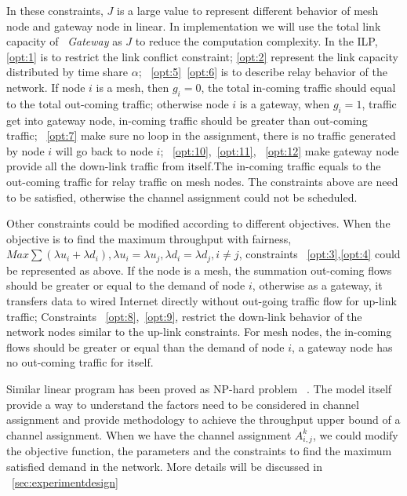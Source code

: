 In these constraints, $J$ is a large value to represent different behavior of mesh node and gateway node in linear. In implementation we will use the total link capacity of ~\emph{Gateway} as $J$ to reduce the computation complexity.
In the ILP, \ref{opt:1} is to restrict the link conflict constraint; \ref{opt:2} represent the link capacity distributed by time share $\alpha$; 
~\ref{opt:5}~\ref{opt:6} is to describe relay behavior of the network. If node $i$ is a mesh, then $g_i=0$, the total in-coming traffic should equal to the total out-coming traffic; otherwise node $i$ is a gateway, when $g_i=1$, traffic get into gateway node, in-coming traffic should be greater than out-coming traffic;
~\ref{opt:7} make sure no loop in the assignment, there is no traffic generated by node $i$ will go back to node $i$;
~\ref{opt:10},~\ref{opt:11}, ~\ref{opt:12}
 make gateway node provide all the down-link traffic from itself.The in-coming traffic equals to the out-coming traffic for relay traffic on mesh nodes.
The constraints above are need to be satisfied, otherwise the channel assignment could not be scheduled.

Other constraints could be modified according to different objectives. When the objective is to find the maximum throughput with fairness, $Max\sum(\lambda u_i+\lambda d_i), \lambda u_i=\lambda u_j, \lambda d_i=\lambda d_j, i\neq j$, constraints ~\ref{opt:3},\ref{opt:4} could be represented as above. 
If the node is a mesh, the summation out-coming flows should be greater or equal to the demand of node $i$, otherwise as a gateway, it transfers data to wired Internet directly without out-going traffic flow for up-link traffic;
Constraints ~\ref{opt:8},~\ref{opt:9}, 
restrict the down-link behavior of the network nodes similar to the up-link constraints. For mesh nodes, the in-coming flows should be greater or equal than the demand of node $i$, a gateway node has no out-coming traffic for itself.


Similar linear program has been proved as NP-hard problem ~\cite{tang2005interference,yuan2006cross}. 
The model itself provide a way to understand the factors need to be considered in channel assignment and provide methodology to achieve the throughput upper bound of a channel assignment.
When we have the channel assignment $A_{i,j}^k$, we could modify the objective function, the parameters and the constraints to find the maximum satisfied demand in the network. More details will be discussed in ~\ref{sec:experimentdesign} 






